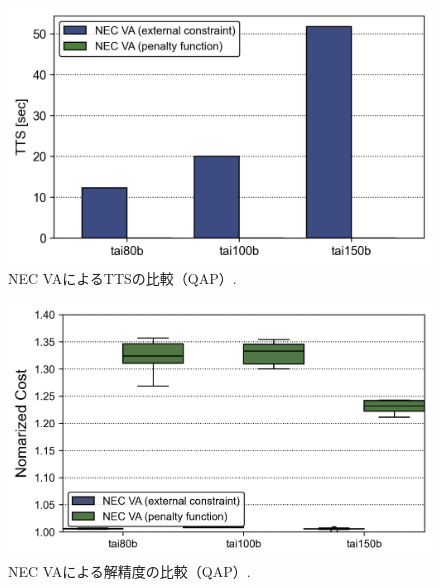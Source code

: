 \documentclass[submit,techrep,noauthor]{ipsj}
\begin{document}

\begin{figure}[th]
\centering
\includegraphics[bb=0 0 700 230, width=15cm]{TTS_QAP_VA.png}
\caption{NEC VAによるTTSの比較（QAP）.}
\label{TTS_QAP_VA}
\end{figure}

\begin{figure}[th]
\centering
\includegraphics[bb=0 0 700 230, width=15cm]{Cost_QAP_VA.png}
\caption{NEC VAによる解精度の比較（QAP）.}
\label{Cost_QAP_VA}
\end{figure}
\end{document}
